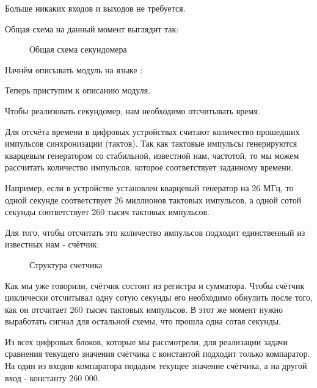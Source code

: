 \par{Больше никаких входов и выходов не требуется.}
\par{Общая схема на данный момент выглядит так:}

\begin{figure}[H]
	\centering
	\def\svgwidth{\columnwidth}
	
	\caption{Общая схема секундомера}
\end{figure}

\par{Начнём описывать модуль на языке :}



\par{Теперь приступим к описанию  модуля.}

\par{Чтобы реализовать секундомер, нам необходимо отсчитывать время.}

\par{Для отсчёта времени в цифровых устройствах считают количество прошедших импульсов синхронизации (тактов). Так как тактовые импульсы генерируются кварцевым генератором со стабильной, известной нам, частотой, то мы можем рассчитать количество импульсов, которое соответствует заданному времени.}

\par{Например, если в устройстве установлен кварцевый генератор на 26 МГц, то одной секунде соответствует 26 миллионов тактовых импульсов, а одной сотой секунды соответствует 260 тысяч тактовых импульсов.}

\par{Для того, чтобы отсчитать это количество импульсов подходит единственный из известных нам  - счётчик:}

\begin{figure}[H]
	\centering
	\def\svgwidth{\columnwidth}
	
	\caption{Структура счетчика}
\end{figure}


\par{Как мы уже говорили, счётчик состоит из регистра и сумматора. Чтобы счётчик циклически отсчитывал одну сотую секунды его необходимо обнулить после того, как он отсчитает 260 тысяч тактовых импульсов. В этот же момент нужно выработать сигнал для остальной схемы, что прошла одна сотая секунды.}

\par{Из всех цифровых блоков, которые мы рассмотрели, для реализации задачи сравнения текущего значения счётчика с константой подходит только компаратор. На один из входов компаратора подадим текущее значение счётчика, а на другой вход - константу 260 000.}


